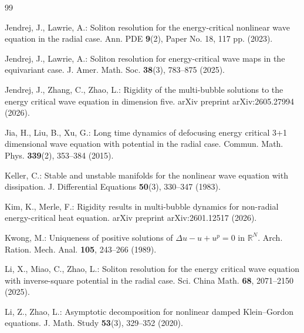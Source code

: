 \documentclass[reqno]{amsart}
\theoremstyle{plain}
\theoremstyle{definition}
\numberwithin{equation}{section}
\begin{document}
\begin{thebibliography}{99}


 Jendrej, J., Lawrie, A.:
Soliton resolution for the energy-critical nonlinear wave equation in the radial case.
Ann. PDE \textbf{9}(2), Paper No. 18, 117 pp. (2023).

 Jendrej, J., Lawrie, A.:
Soliton resolution for energy-critical wave maps in the equivariant case.
J. Amer. Math. Soc. \textbf{38}(3), 783--875 (2025).

 Jendrej, J., Zhang, C., Zhao, L.:
Rigidity of the multi-bubble solutions to the energy critical wave equation in dimension five.
arXiv preprint arXiv:2605.27994 (2026).

 Jia, H., Liu, B., Xu, G.:
Long time dynamics of defocusing energy critical 3+1 dimensional wave equation with potential in the radial case.
Commun. Math. Phys. \textbf{339}(2), 353--384 (2015).

 Keller, C.:
Stable and unstable manifolds for the nonlinear wave equation with dissipation.
J. Differential Equations \textbf{50}(3), 330--347 (1983).


 Kim, K., Merle, F.:
Rigidity results in multi-bubble dynamics for non-radial energy-critical heat equation.
arXiv preprint arXiv:2601.12517 (2026).

 Kwong, M.:
Uniqueness of positive solutions of $\Delta u-u+u^p=0$ in $\mathbb{R}^N$.
Arch. Ration. Mech. Anal. \textbf{105}, 243--266 (1989).

 Li, X., Miao, C., Zhao, L.:
Soliton resolution for the energy critical wave equation with inverse-square potential in the radial case.
Sci. China Math. \textbf{68}, 2071--2150 (2025).

 Li, Z., Zhao, L.:
Asymptotic decomposition for nonlinear damped Klein--Gordon equations.
J. Math. Study \textbf{53}(3), 329--352 (2020).

%
%


\end{thebibliography}
\end{document}
